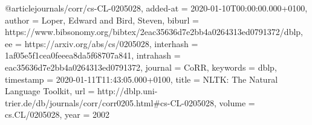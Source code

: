 @article{journals/corr/cs-CL-0205028,
  added-at = {2020-01-10T00:00:00.000+0100},
  author = {Loper, Edward and Bird, Steven},
  biburl = {https://www.bibsonomy.org/bibtex/2eac35636d7e2bb4a0264313ed0791372/dblp},
  ee = {https://arxiv.org/abs/cs/0205028},
  interhash = {1af05e5f1cea0feeea8da5f68707a841},
  intrahash = {eac35636d7e2bb4a0264313ed0791372},
  journal = {CoRR},
  keywords = {dblp},
  timestamp = {2020-01-11T11:43:05.000+0100},
  title = {NLTK: The Natural Language Toolkit},
  url = {http://dblp.uni-trier.de/db/journals/corr/corr0205.html#cs-CL-0205028},
  volume = {cs.CL/0205028},
  year = 2002
}

